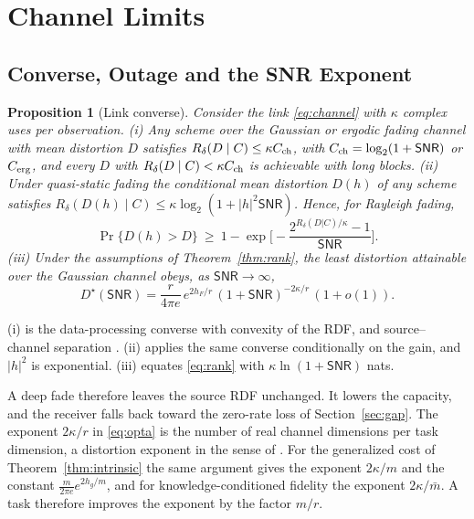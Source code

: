 \documentclass[10pt,journal]{IEEEtran}
\newtheorem{proposition}{Proposition}
\newcommand{\snr}{\mathsf{SNR}}
\begin{document}
\section{Channel Limits}\label{sec:channel}
\subsection{Converse, Outage and the SNR Exponent}
\begin{proposition}[Link converse]\label{prop:link}
Consider the link \eqref{eq:channel} with $\kappa$ complex uses per observation. (i) Any scheme over the Gaussian or ergodic fading channel with mean distortion $D$ satisfies $R_\delta(D\mid C)\le\kappa C_{\rm ch}$, with $C_{\rm ch}=\log_2(1+\snr)$ or $C_{\rm erg}$, and every $D$ with $R_\delta(D\mid C)<\kappa C_{\rm ch}$ is achievable with long blocks. (ii) Under quasi-static fading the conditional mean distortion $D(h)$ of any scheme satisfies $R_\delta(D(h)\mid C)\le\kappa\log_2(1+|h|^2\snr)$. Hence, for Rayleigh fading,
\begin{equation}
 \Pr\{D(h)>D\}\ \ge\ 1-\exp\!\Big[-\frac{2^{R_\delta(D|C)/\kappa}-1}{\snr}\Big]. \label{eq:outage}
\end{equation}
(iii) Under the assumptions of Theorem~\ref{thm:rank}, the least distortion attainable over the Gaussian channel obeys, as $\snr\to\infty$,
\begin{equation}
 D^\star(\snr)=\frac{r}{4\pi e}\,e^{2h_F/r}\,(1+\snr)^{-2\kappa/r}\,(1+o(1)). \label{eq:opta}
\end{equation}
\end{proposition}
\begin{IEEEproof}
(i) is the data-processing converse with convexity of the RDF, and source--channel separation \cite{cover2006elements}. (ii) applies the same converse conditionally on the gain, and $|h|^2$ is exponential. (iii) equates \eqref{eq:rank} with $\kappa\ln(1+\snr)$ nats.
\end{IEEEproof}
A deep fade therefore leaves the source RDF unchanged. It lowers the capacity, and the receiver falls back toward the zero-rate loss of Section~\ref{sec:gap}. The exponent $2\kappa/r$ in \eqref{eq:opta} is the number of real channel dimensions per task dimension, a distortion exponent in the sense of \cite{laneman2005source}. For the generalized cost of Theorem~\ref{thm:intrinsic} the same argument gives the exponent $2\kappa/m$ and the constant $\frac{m}{2\pi e}e^{2h_g/m}$, and for knowledge-conditioned fidelity the exponent $2\kappa/\bar m$. A task therefore improves the exponent by the factor $m/r$.
\end{document}
